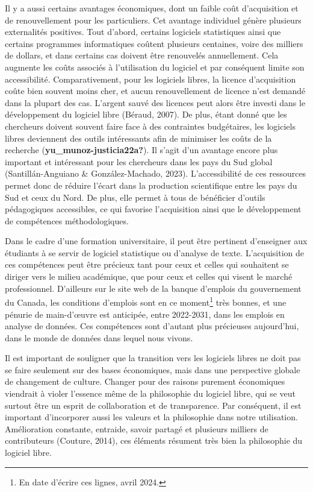\documentclass[
  letterpaper,
  DIV=11,
  numbers=noendperiod]{scrreprt}
\begin{document}
Il y a aussi certains avantages économiques, dont un faible coût
d'acquisition et de renouvellement pour les particuliers. Cet avantage
individuel génère plusieurs externalités positives. Tout d'abord,
certains logiciels statistiques ainsi que certains programmes
informatiques coûtent plusieurs centaines, voire des milliers de
dollars, et dans certains cas doivent être renouvelés annuellement. Cela
augmente les coûts associés à l'utilisation du logiciel et par
conséquent limite son accessibilité. Comparativement, pour les logiciels
libres, la licence d'acquisition coûte bien souvent moins cher, et aucun
renouvellement de licence n'est demandé dans la plupart des cas.
L'argent sauvé des licences peut alors être investi dans le
développement du logiciel libre (Béraud, 2007). De plus, étant donné que
les chercheurs doivent souvent faire face à des contraintes budgétaires,
les logiciels libres deviennent des outils intéressants afin de
minimiser les coûts de la recherche (\textbf{yu\_munoz-justicia22a?}).
Il s'agit d'un avantage encore plus important et intéressant pour les
chercheurs dans les pays du Sud global (Santillán-Anguiano \&
González-Machado, 2023). L'accessibilité de ces ressources permet donc
de réduire l'écart dans la production scientifique entre les pays du Sud
et ceux du Nord. De plus, elle permet à tous de bénéficier d'outils
pédagogiques accessibles, ce qui favorise l'acquisition ainsi que le
développement de compétences méthodologiques.

Dans le cadre d'une formation universitaire, il peut être pertinent
d'enseigner aux étudiants à se servir de logiciel statistique ou
d'analyse de texte. L'acquisition de ces compétences peut être précieux
tant pour ceux et celles qui souhaitent se diriger vers le milieu
académique, que pour ceux et celles qui visent le marché professionnel.
D'ailleurs sur le site web de la banque d'emplois du gouvernement du
Canada, les conditions d'emplois sont en ce moment\footnote{En date
  d'écrire ces lignes, avril 2024.} très bonnes, et une pénurie de
main-d'œuvre est anticipée, entre 2022-2031, dans les emplois en analyse
de données. Ces compétences sont d'autant plus précieuses aujourd'hui,
dans le monde de données dans lequel nous vivons.

Il est important de souligner que la transition vers les logiciels
libres ne doit pas se faire seulement sur des bases économiques, mais
dans une perspective globale de changement de culture. Changer pour des
raisons purement économiques viendrait à violer l'essence même de la
philosophie du logiciel libre, qui se veut surtout être un esprit de
collaboration et de transparence. Par conséquent, il est important
d'incorporer aussi les valeurs et la philosophie dans notre utilisation.
Amélioration constante, entraide, savoir partagé et plusieurs milliers
de contributeurs (Couture, 2014), ces éléments résument très bien la
philosophie du logiciel libre.
\end{document}
